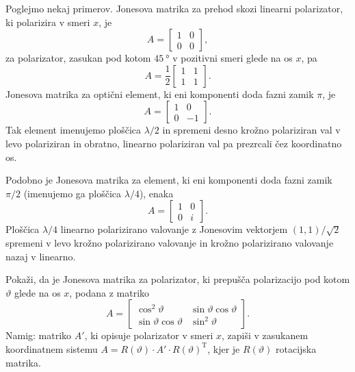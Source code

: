 Poglejmo nekaj primerov. Jonesova matrika za prehod skozi linearni polarizator, ki
polarizira v smeri $x$, je
\begin{equation}
A=\left[\begin{array}{cc}
1 & 0\\
0 & 0
\end{array}\right],
\end{equation}
za polarizator, zasukan pod kotom $45~\si{\degree}$ v pozitivni smeri glede na os $x$, pa
\begin{equation}
A=\frac{1}{2}\left[\begin{array}{cc}
1 & 1\\
1 & 1
\end{array}\right].
\end{equation}
Jonesova matrika za optični element, ki eni komponenti doda fazni zamik $\pi$, je
\begin{equation}
A=\left[\begin{array}{cc}
1 & 0\\
0 & -1
\end{array}\right].
\end{equation}
Tak element imenujemo ploščica $\lambda/2$ in 
spremeni desno krožno polariziran val v levo 
polariziran in obratno, linearno polariziran val pa prezrcali čez koordinatno os. 

Podobno je Jonesova matrika za element, ki eni komponenti doda fazni zamik $\pi/2$ 
(imenujemo ga ploščica $\lambda/4$), enaka
\begin{equation}
A=\left[\begin{array}{cc}
1 & 0\\
0 & i
\end{array}\right].
\end{equation}
Ploščica $\lambda/4$ linearno polarizirano valovanje z Jonesovim vektorjem $(1,1)/\sqrt{2}$
spremeni v levo krožno polarizirano valovanje in krožno polarizirano
valovanje nazaj v linearno. 

\begin{definition}
Pokaži, da je Jonesova matrika za polarizator,
ki prepušča polarizacijo pod kotom $\vartheta$ glede na os $x$, podana z matriko
\begin{equation}
A=\left[\begin{array}{cc}
\cos^{2}\vartheta & \sin\vartheta\cos\vartheta\\
\sin\vartheta\cos\vartheta & \sin^{2}\vartheta
\end{array}\right].
\end{equation}
Namig: matriko $A'$, ki opisuje polarizator v smeri $x$, zapiši v zasukanem
koordinatnem sistemu $A=R(\vartheta) \cdot {A'}\cdot R(\vartheta)^\textrm{T}$, 
kjer je $R(\vartheta)$ rotacijska matrika.
\end{definition}

